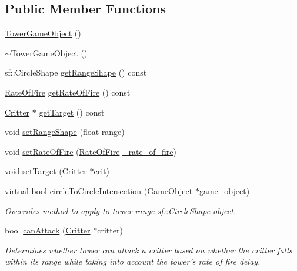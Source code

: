 \subsection*{Public Member Functions}
\begin{DoxyCompactItemize}
\item 
\hyperlink{class_tower_game_object_ae587eca041adf51c144a376564fac17e}{Tower\+Game\+Object} ()
\item 
\hyperlink{class_tower_game_object_a87241c8025188b610e3fb520608a85fa}{$\sim$\+Tower\+Game\+Object} ()
\item 
sf\+::\+Circle\+Shape \hyperlink{class_tower_game_object_a0e49616a6bb7cea91b45288a886e7e8e}{get\+Range\+Shape} () const 
\item 
\hyperlink{class_tower_game_object_a6a687237ad352e41acb35f8b4cf25fa3}{Rate\+Of\+Fire} \hyperlink{class_tower_game_object_a176b325a7415c42dd368a958d52f912c}{get\+Rate\+Of\+Fire} () const 
\item 
\hyperlink{class_critter}{Critter} $\ast$ \hyperlink{class_tower_game_object_abd2539f169fb1011d57bdf61cd1fca0d}{get\+Target} () const 
\item 
void \hyperlink{class_tower_game_object_a9e83986372f5cba1f6788d61c27c52f7}{set\+Range\+Shape} (float range)
\item 
void \hyperlink{class_tower_game_object_a44938da9215d2552043ddc7b35067be0}{set\+Rate\+Of\+Fire} (\hyperlink{class_tower_game_object_a6a687237ad352e41acb35f8b4cf25fa3}{Rate\+Of\+Fire} \hyperlink{class_tower_game_object_a791d99099306673e85ed6b93fd6f7b1b}{\+\_\+rate\+\_\+of\+\_\+fire})
\item 
void \hyperlink{class_tower_game_object_ad4c6aaebbc3602bee857a625d1fbc004}{set\+Target} (\hyperlink{class_critter}{Critter} $\ast$crit)
\item 
virtual bool \hyperlink{class_tower_game_object_a824c0212a0c2958d9facfa97947c7332}{circle\+To\+Circle\+Intersection} (\hyperlink{class_game_object}{Game\+Object} $\ast$game\+\_\+object)
\begin{DoxyCompactList}\small\item\em Overrides method to apply to tower range sf\+::\+Circle\+Shape object. \end{DoxyCompactList}\item 
bool \hyperlink{class_tower_game_object_a16d07954c10a2a54c202fe2e2fdc7de3}{can\+Attack} (\hyperlink{class_critter}{Critter} $\ast$critter)
\begin{DoxyCompactList}\small\item\em Determines whether tower can attack a critter based on whether the critter falls within its range while taking into account the tower's rate of fire delay. \end{DoxyCompactList}\item 

\end{DoxyCompactItemize}
